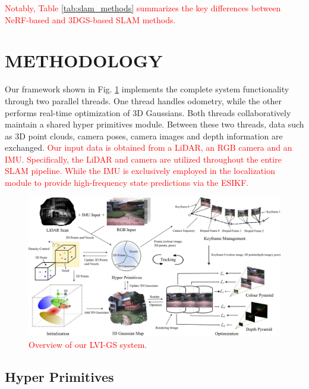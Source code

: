 \documentclass[lettersize,journal]{IEEEtran}
\begin{document}
\textcolor{red}{Notably, Table \ref{tab:slam_methods} summarizes the key differences between NeRF-based and 3DGS-based SLAM methods.}


\section{METHODOLOGY}
Our framework shown in Fig. \ref{pipeline} implements the complete system functionality through two parallel threads. One thread handles odometry, while the other performs real-time optimization of 3D Gaussians. Both threads collaboratively maintain a shared hyper primitives module. Between these two threads, data such as 3D point clouds, camera poses, camera images and depth information are exchanged. \textcolor{red}{Our input data is obtained from a LiDAR, an RGB camera and an IMU. Specifically, the LiDAR and camera are utilized throughout the entire SLAM pipeline. While the IMU is exclusively employed in the localization module to provide high-frequency state predictions via the ESIKF.}
\begin{figure}[htb]  %
        \captionsetup{justification=justified, labelsep=colon}%
        \centering
        \includegraphics[width=2.0\columnwidth]{image/pipeline_revise.jpg}
        \caption{\textcolor{red}{Overview of our LVI-GS system.}
        }  %
        \label{pipeline}
\end{figure}%

\subsection{Hyper Primitives}
\end{document}
